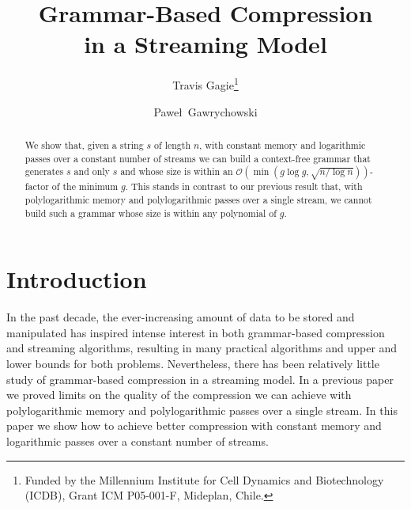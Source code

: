 \documentclass[runningheads]{llncs}
\newcommand{\Oh}[1]
    {\ensuremath{\mathcal{O}\!\left( {#1} \right)}}
\begin{document}
\title{Grammar-Based Compression\\in a Streaming Model}
\author{Travis Gagie\fnmsep\thanks
    {Funded by the Millennium Institute for Cell Dynamics and Biotechnology (ICDB),
    Grant ICM P05-001-F, Mideplan, Chile.}
    \and Pawe\l\ Gawrychowski}
\maketitle

\begin{abstract}
We show that, given a string $s$ of length $n$, with constant memory and logarithmic passes over a constant number of streams we can build a context-free grammar that generates $s$ and only $s$ and whose size is within an $\Oh{\min \left( g \log g, \sqrt{n / \log n} \right)}$-factor of the minimum $g$.  This stands in contrast to our previous result that, with polylogarithmic memory and polylogarithmic passes over a single stream, we cannot build such a grammar whose size is within any polynomial of $g$.
\end{abstract}

\section{Introduction} \label{sec:intro}

In the past decade, the ever-increasing amount of data to be stored and manipulated has inspired intense interest in both grammar-based compression and streaming algorithms, resulting in many practical algorithms and upper and lower bounds for both problems.  Nevertheless, there has been relatively little study of grammar-based compression in a streaming model.  In a previous paper~\cite{Gag09} we proved limits on the quality of the compression we can achieve with polylogarithmic memory and polylogarithmic passes over a single stream.  In this paper we show how to achieve better compression with constant memory and logarithmic passes over a constant number of streams.
\end{document}
